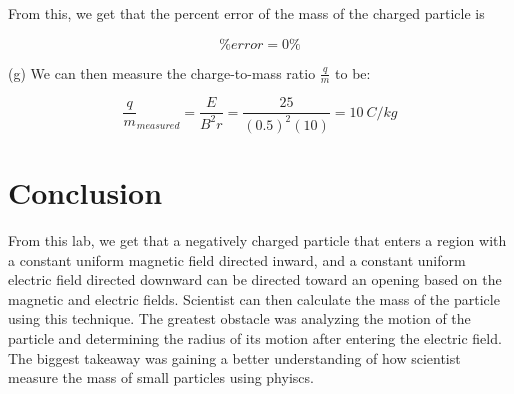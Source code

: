 \documentclass[12pt]{article}
\begin{document}
From this, we get that the percent error of the mass of the charged particle is

\[\% error = 0\%\]

\bigskip

(g) We can then measure the charge-to-mass ratio $\frac{q}{m}$ to be:

\[\frac{q}{m}_{measured} = \frac{E}{B^2r} = \frac{25}{(0.5)^2(10)} = \SI{10}{C/kg}\]

\section{Conclusion}
From this lab, we get that a negatively charged particle that enters a region with a constant uniform magnetic field directed inward, and a constant uniform electric field directed downward can be directed toward an opening based on the magnetic and electric fields. Scientist can then calculate the mass of the particle using this technique. The greatest obstacle was analyzing the motion of the particle and determining the radius of its motion after entering the electric field. The biggest takeaway was gaining a better understanding of how scientist measure the mass of small particles using phyiscs.
\end{document}

